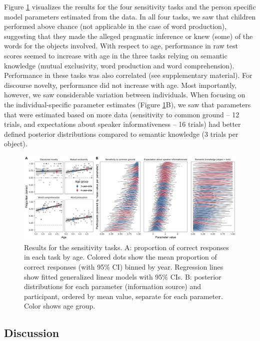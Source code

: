\documentclass[
  man,floatsintext]{apa6}
\begin{document}
Figure \ref{fig:fig2} visualizes the results for the four sensitivity tasks and the person specific model parameters estimated from the data. In all four tasks, we saw that children performed above chance (not applicable in the case of word production), suggesting that they made the alleged pragmatic inference or knew (some) of the words for the objects involved. With respect to age, performance in raw test scores seemed to increase with age in the three tasks relying on semantic knowledge (mutual exclusivity, word production and word comprehension). Performance in these tasks was also correlated (see supplementary material). For discourse novelty, performance did not increase with age. Most importantly, however, we saw considerable variation between individuals. When focusing on the individual-specific parameter estimates (Figure \ref{fig:fig2}B), we saw that parameters that were estimated based on more data (sensitivity to common ground -- 12 trials, and expectations about speaker informativeness -- 16 trials) had better defined posterior distributions compared to semantic knowledge (3 trials per object).

\begin{figure}
\includegraphics[width=1\linewidth]{./figures/fig2_1} \caption{Results for the sensitivity tasks. A: proportion of correct responses in each task by age. Colored dots show the mean proportion of correct responses (with 95\% CI) binned by year. Regression lines show fitted generalized linear models with 95\% CIs. B: posterior distributions for each parameter (information source) and participant, ordered by mean value, separate for each parameter. Color shows age group.}\label{fig:fig2}
\end{figure}

\hypertarget{discussion}{%
\subsection{Discussion}\label{discussion}}
\end{document}
